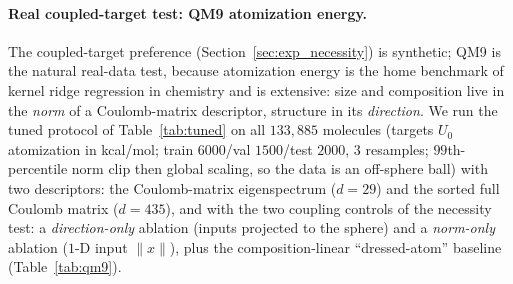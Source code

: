 \documentclass{article}
\begin{document}
\paragraph{Real coupled-target test: QM9 atomization energy.}
The coupled-target preference (Section~\ref{sec:exp_necessity}) is synthetic; QM9 \citep{ramakrishnan2014quantum} is the natural real-data test, because atomization energy is the home benchmark of kernel ridge regression in chemistry \citep{rupp2012fast} and is extensive: size and composition live in the \emph{norm} of a Coulomb-matrix descriptor, structure in its \emph{direction}. We run the tuned protocol of Table~\ref{tab:tuned} on all $133{,}885$ molecules (targets $U_0$ atomization in kcal/mol; train $6000$/val $1500$/test $2000$, $3$ resamples; $99$th-percentile norm clip then global scaling, so the data is an off-sphere ball) with two descriptors: the Coulomb-matrix eigenspectrum ($d=29$) and the sorted full Coulomb matrix ($d=435$), and with the two coupling controls of the necessity test: a \emph{direction-only} ablation (inputs projected to the sphere) and a \emph{norm-only} ablation ($1$-D input $\|x\|$), plus the composition-linear ``dressed-atom'' baseline (Table~\ref{tab:qm9}).
\end{document}
